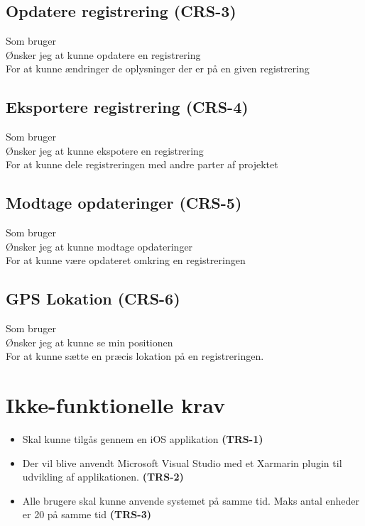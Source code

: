 	\subsection*{Opdatere registrering (CRS-3)}
	Som bruger\\
	Ønsker jeg at kunne opdatere en registrering\\
	For at kunne ændringer de oplysninger der er på en given registrering
	
	\subsection*{Eksportere registrering (CRS-4)}
	Som bruger\\
	Ønsker jeg at kunne ekspotere en registrering\\
	For at kunne dele registreringen med andre parter af projektet
	
	\subsection*{Modtage opdateringer (CRS-5)}
	Som bruger\\
	Ønsker jeg at kunne modtage opdateringer\\
	For at kunne være opdateret omkring en registreringen
	
	\subsection*{GPS Lokation (CRS-6)}
	Som bruger\\
	Ønsker jeg at kunne se min positionen \\
	For at kunne sætte en præcis lokation på en registreringen. \\
	
	\section{Ikke-funktionelle krav}
	\begin{itemize}[-]
		\itemsep 0.3em 
		\item Skal kunne tilgås gennem en iOS applikation \textbf{(TRS-1)}
		\item Der vil blive anvendt Microsoft Visual Studio med et Xarmarin plugin til udvikling af applikationen. \textbf{(TRS-2)}
		\item Alle brugere skal kunne anvende systemet på samme tid. Maks antal enheder er 20 på samme tid \textbf{(TRS-3)}
	\end{itemize}


